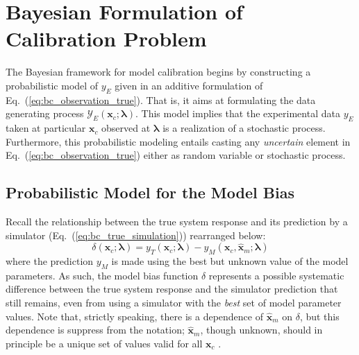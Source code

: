 \section{Bayesian Formulation of Calibration Problem}\label{sec:bc_modular}

The Bayesian framework for model calibration begins by constructing a probabilistic model of $y_E$ given in an additive formulation of Eq.~(\ref{eq:bc_observation_true}). 
That is, it aims at formulating the data generating process $\mathcal{Y}_E(\bm{x}_c; \bm{\lambda})$.
This model implies that the experimental data $y_E$ taken at particular $\bm{x}_c$ observed at $\bm{\lambda}$ is a realization of a stochastic process.
Furthermore, this probabilistic modeling entails casting any \emph{uncertain} element in Eq.~(\ref{eq:bc_observation_true}) either as random variable or stochastic process.

\subsection{Probabilistic Model for the Model Bias}\label{sub:bc_modular_bias}

Recall the relationship between the true system response and its prediction by a simulator (Eq.~(\ref{eq:bc_true_simulation})) rearranged below:
\begin{equation*}
    \delta (\bm{x}_c; \boldsymbol{\lambda}) = y_T(\bm{x}_c; \boldsymbol{\lambda}) - y_M (\bm{x}_c, \hat{\bm{x}}_m; \boldsymbol{\lambda})
\end{equation*}
where the prediction $y_M$ is made using the best but unknown value of the model parameters.
As such, the model bias function $\delta$ represents a possible systematic difference between the true system response and the simulator prediction that still remains, even from using a simulator with the \emph{best} set of model parameter values.
Note that, strictly speaking, there is a dependence of $\hat{\bm{x}}_m$ on $\delta$, but this dependence is suppress from the notation; $\hat{\bm{x}}_m$, though unknown, should in principle be a unique set of values valid for all $\bm{x}_c$ \cite{Bayarri2007,Arendt2012}.

